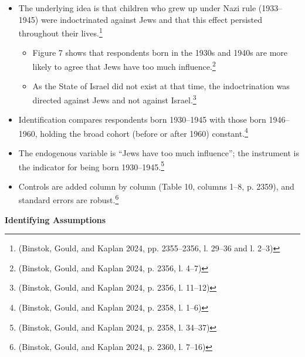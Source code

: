 \begin{itemize}
\item
  The underlying idea is that children who grew up under Nazi rule (1933--1945) were indoctrinated against Jews and that this effect persisted throughout their lives.\footnote{(Binstok, Gould, and Kaplan 2024, pp. 2355--2356, l. 29--36 and l. 2--3)}

  \begin{itemize}
  \item
    Figure 7 shows that respondents born in the 1930s and 1940s are more likely to agree that Jews have too much influence.\footnote{(Binstok, Gould, and Kaplan 2024, p. 2356, l. 4--7)}
  \item
    As the State of Israel did not exist at that time, the indoctrination was directed against Jews and not against Israel.\footnote{(Binstok, Gould, and Kaplan 2024, p. 2356, l. 11--12)}
  \end{itemize}
\item
  Identification compares respondents born 1930--1945 with those born 1946--1960, holding the broad cohort (before or after 1960) constant.\footnote{(Binstok, Gould, and Kaplan 2024, p. 2358, l. 1--6)}
\item
  The endogenous variable is ``Jews have too much influence''; the instrument is the indicator for being born 1930--1945.\footnote{(Binstok, Gould, and Kaplan 2024, p. 2358, l. 34--37)}
\item
  Controls are added column by column (Table 10, columns 1--8, p. 2359), and standard errors are robust.\footnote{(Binstok, Gould, and Kaplan 2024, p. 2360, l. 7--16)}
\end{itemize}

\par\textbf{Identifying Assumptions}\par

